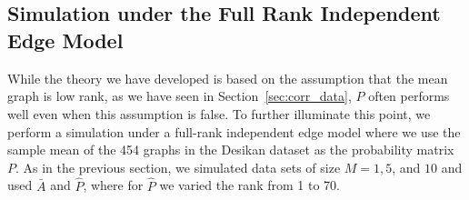 \documentclass[a4paper]{article}
\begin{document}
%
%
%


\subsection{Simulation under the Full Rank Independent Edge Model}\label{sec:sim_iem}

While the theory we have developed is based on the assumption that the mean graph is low rank, as we have seen in Section~\ref{sec:corr_data}, $\hat{P}$ often performs well even when this assumption is false. 
To further illuminate this point, we perform a simulation under a full-rank independent edge model where we use the sample mean of the 454 graphs in the Desikan dataset as the probability matrix $P$.
As in the previous section, we simulated data sets of size $M=1,5$, and $10$ and used $\bar{A}$ and $\hat{P}$, where for $\hat{P}$ we varied the rank from 1 to 70.
\end{document}
